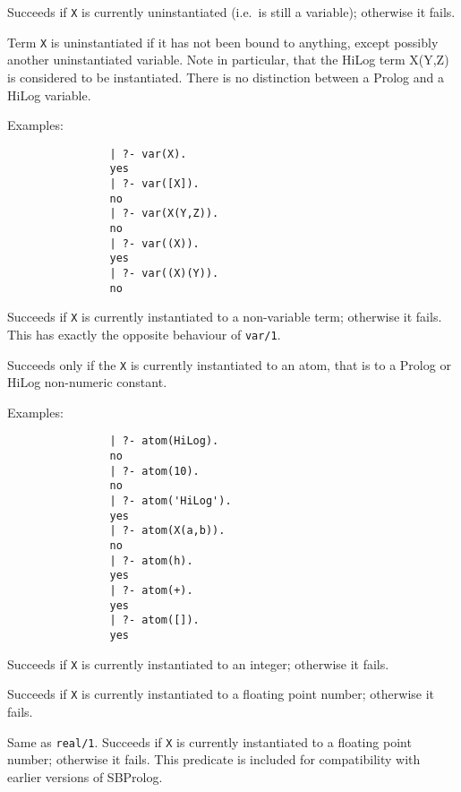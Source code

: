\begin{description}
    Succeeds if {\tt X} is currently uninstantiated (i.e.\ is still a 
    variable); otherwise it fails.  

    Term {\tt X} is uninstantiated if it has not been bound to anything, 
    except possibly another uninstantiated variable. Note in particular,
    that the HiLog term X(Y,Z) is considered to be instantiated.  There 
    is no distinction between a Prolog and a HiLog variable.

    Examples:
    {\footnotesize
     \begin{verbatim}
                | ?- var(X).
                yes
                | ?- var([X]).
                no
                | ?- var(X(Y,Z)).
                no
                | ?- var((X)).
                yes
                | ?- var((X)(Y)).
                no
     \end{verbatim}}


    Succeeds if {\tt X} is currently instantiated to a non-variable term;
    otherwise it fails. This has exactly the opposite behaviour of 
    {\tt var/1}\@.

    Succeeds only if the {\tt X} is currently instantiated to an atom, that
    is to a Prolog or HiLog non-numeric constant.

    Examples:
    {\footnotesize
     \begin{verbatim}
                | ?- atom(HiLog).
                no
                | ?- atom(10).
                no
                | ?- atom('HiLog').
                yes
                | ?- atom(X(a,b)).
                no
                | ?- atom(h).
                yes
                | ?- atom(+).
                yes
                | ?- atom([]).
                yes
     \end{verbatim}}

    Succeeds if {\tt X} is currently instantiated to an integer; 
    otherwise it fails. 

    Succeeds if {\tt X} is currently instantiated to a floating point number;
    otherwise it fails. 

    Same as {\tt real/1}. Succeeds if {\tt X} is currently instantiated 
    to a floating point number; otherwise it fails.  This predicate is 
    included for compatibility with earlier versions of SBProlog.
	

\end{description}
